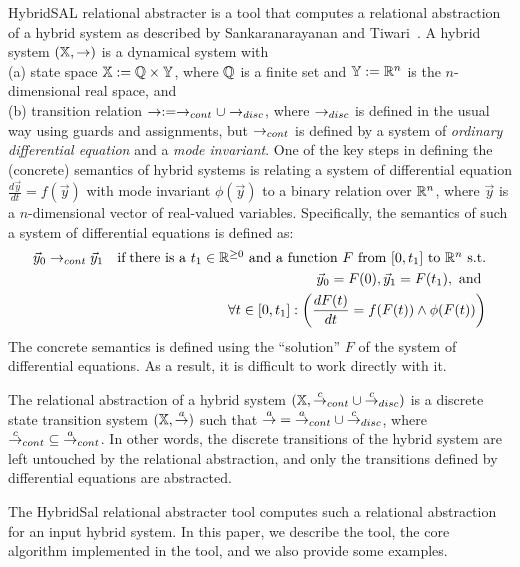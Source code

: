 \documentclass{llncs}
\begin{document}
HybridSAL relational abstracter is a tool that computes a relational
abstraction of a hybrid system as described by
Sankaranarayanan and Tiwari~\cite{ST11:CAVsmall}.
A hybrid system $(\mathbb{X}, \rightarrow)$ is a dynamical system with 
\\
(a) state space $\mathbb{X} := \mathbb{Q}\times\mathbb{Y}$, where $\mathbb{Q}$ is a finite set and
$\mathbb{Y} := \mathbb{R}^n$ is the $n$-dimensional real space,
and 
\\
(b)
transition relation $\rightarrow := \rightarrow_{cont}\cup\rightarrow_{disc}$, where
$\rightarrow_{disc}$ is defined in the usual way using guards and
assignments, but $\rightarrow_{cont}$ is defined by a system of
{\em{ordinary differential equation}} and a {\em{mode invariant}}.
One of the key steps in defining the (concrete)
semantics of hybrid systems
is relating a system of differential equation
$\frac{d\vec{y}}{dt} = f(\vec{y})$ with mode invariant
$\phi(\vec{y})$ to a binary relation 
over $\mathbb{R}^n$, where $\vec{y}$ is a $n$-dimensional vector of
real-valued variables.  Specifically, the semantics of
such a system of differential equations is defined as:
\begin{eqnarray}
\vec{y}_0 \ra_{cont} \vec{y}_1 & &
\mbox{if}\;
\mbox{there is a $t_1\in\RR^{\geq 0}$ and 
a function $F$ from $[0,t_1]$ to $\RR^n$ s.t.} \nonumber %
\\ & &
\vec{y}_0 = F(0),
\vec{y}_1 = F(t_1), \mbox{ and } \nonumber
\\ & &
\forall{t\in [0,t_1]}:
\left(\frac{dF(t)}{dt} = f(F(t)) \wedge \phi(F(t))\right)\label{eqn:sem}
%
\end{eqnarray}
The concrete semantics is defined using the ``solution''
$F$ of the system of differential equations.  As a result,
it is difficult to work directly with it.

The relational abstraction of a hybrid system 
$(\mathbb{X}, {\stackrel{c}{\rightarrow}}_{cont}\cup{\stackrel{c}{\rightarrow}}_{disc})$ 
is a discrete state transition system $(\mathbb{X}, {\stackrel{a}{\rightarrow}})$ such that
${\stackrel{a}{\rightarrow}} = {\stackrel{a}{\rightarrow}}_{cont}\cup{\stackrel{c}{\rightarrow}}_{disc}$, where 
${\stackrel{c}{\rightarrow}}_{cont} \subseteq {\stackrel{a}{\rightarrow}}_{cont}$.
In other words, the discrete transitions of the hybrid system
are left untouched by the relational abstraction, and only the
transitions defined by differential equations are abstracted.

The HybridSal relational abstracter tool computes such a relational
abstraction for an input hybrid system. 
In this paper, we describe the tool, the core algorithm implemented in the
tool, and we also provide some examples. %
\end{document}
